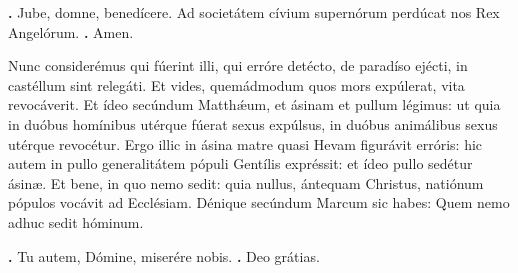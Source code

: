 \begin{small}
\textbf{\Vbar.} Jube, domne, benedícere.
Ad societátem cívium supernórum perdúcat nos Rex Angelórum. \textbf{\Rbar.} Amen.
\end{small}


Nunc considerémus qui fúerint illi, qui erróre detécto, de paradíso ejécti, in castéllum sint relegáti. Et vides, quemádmodum quos mors expúlerat, vita revocáverit. Et ídeo secúndum Matth\'{\ae}um, et ásinam et pullum légimus: ut quia in duóbus homínibus utérque fúerat sexus expúlsus, in duóbus animálibus sexus utérque revocétur. Ergo illic in ásina matre quasi Hevam figurávit erróris: hic autem in pullo generalitátem pópuli Gentílis expréssit: et ídeo pullo sedétur ásinæ. Et bene, in quo nemo sedit: quia nullus, ántequam Christus, natiónum pópulos vocávit ad Ecclésiam. Dénique secúndum Marcum sic habes: Quem nemo adhuc sedit hóminum.

\textbf{\Vbar.} Tu autem, Dómine, miserére nobis.
\textbf{\Rbar.} Deo grátias.


